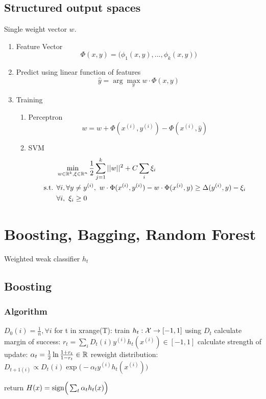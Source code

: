 \documentclass[a4paper]{report}
\begin{document}
\section{Structured output spaces}
Single weight vector $w$. 
\begin{enumerate}
\item Feature Vector
$$
\Phi(x, y) = \big(\phi_1(x,y),...,\phi_k(x, y)\big)
$$
\item Predict using linear function of features 
$$
\hat y = \arg\max_y w\cdot \Phi(x, y)
$$
\item Training 
\begin{enumerate}
\item Perceptron
$$
w = w + \Phi(x^{(i)}, y^{(i)})-\Phi(x^{(i)}, \hat y)
$$

\item SVM
\begin{align*}
&\min_{w \in \mathbb{R}^k, \xi\in \mathbb{R}^n} \frac{1}{2}\sum_{j=1}^k ||w||^2+C\sum_i
\xi_i \\
\text{s.t. } &\forall i, \forall y \neq y^{(i)},~  w\cdot \Phi(x^{(i)}, y^{(i)})-w\cdot \Phi(x^{(i)}, y)\geq \Delta(y^{(i)}, y)-\xi_i \\
& \forall i,~ \xi_i\geq0
\end{align*}
\end{enumerate}
\end{enumerate}

\chapter{Boosting, Bagging, Random Forest}
Weighted weak classifier $h_t$

\section{Boosting}
\subsection{Algorithm}
\begin{python}[mathescape]
$D_0(i)=\frac{1}{n}, \forall i$
for t in xrange(T):
  train $h_t: \mathcal{X}\rightarrow [-1, 1]$ using $D_t$
  calculate margin of success: $r_t=\sum_i D_t(i)y^{(i)}h_t(x^{(i)})\in [-1, 1]$
  calculate strength of update: $\alpha_t = \frac{1}{2}\ln {\frac{1+r_t}{1-r_t}}\in \mathbb{R}$
  reweight distribution: $D_{t+1(i)}\propto D_t(i)\exp\big(-\alpha_t y^{(i)}h_t(x^{(i)})\big)$
  
return $H(x)=\text{sign}\Big(\sum_t \alpha_t h_t(x)\Big)$
\end{python}
\end{document}
